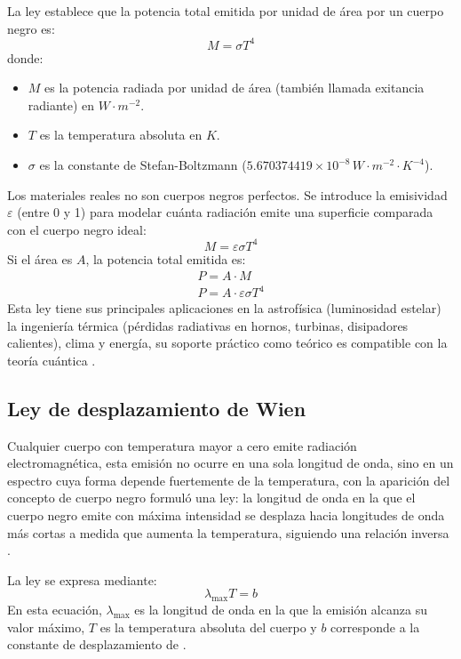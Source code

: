 \documentclass[11pt,a4paper,spanish]{book}
\begin{document}
La ley establece que la potencia total emitida por unidad de
área por un cuerpo negro es:
\begin{equation}
  M = \sigma T^4
\end{equation}
donde:
\begin{itemize}[nosep]
  \item $M$ es la potencia radiada por unidad de área (también llamada
    exitancia radiante) en $W\cdot m^{-2}$.
  \item $T$ es la temperatura absoluta en $K$.
  \item $\sigma$ es la constante de Stefan-Boltzmann ($5.670374419
    \times 10^{-8} \, W\cdot m^{-2}\cdot K^{-4}$).
\end{itemize}
Los materiales reales no son cuerpos negros perfectos. Se introduce
la emisividad \(\varepsilon \) (entre 0 y 1)
para modelar cuánta radiación emite una superficie comparada con el
cuerpo negro ideal:
\begin{equation}
  M = \varepsilon \sigma T^4
\end{equation}
Si el área es \(A\), la potencia total emitida es:
\begin{equation}
  \begin{aligned}
    P = A \cdot M \\
    P = A \cdot \varepsilon \sigma T^4
  \end{aligned}
\end{equation}
Esta ley tiene sus principales aplicaciones en la astrofísica
(luminosidad estelar) la ingeniería térmica (pérdidas radiativas
en hornos, turbinas, disipadores calientes), clima y energía, su
soporte práctico como teórico es compatible con la teoría
cuántica \citep{planck1900}.
\subsection{Ley de desplazamiento de Wien}
Cualquier cuerpo con temperatura mayor a cero emite radiación
electromagnética, esta emisión no ocurre en una sola longitud de onda,
sino en un espectro cuya forma depende fuertemente de la temperatura,
con la aparición del concepto
de cuerpo negro \cite{wien1893} formuló una ley: la longitud de onda
en la que el
cuerpo negro emite con máxima intensidad se desplaza hacia longitudes
de onda más
cortas a medida que aumenta la temperatura, siguiendo una relación
inversa \cite{wien1893}.

La ley se expresa mediante:
\begin{equation}
  \lambda_{\text{max}} T = b
\end{equation}
En esta ecuación, \(\lambda_{\text{max}}\) es la longitud de onda en la que la
emisión alcanza su valor máximo, \(T\) es la temperatura absoluta del
cuerpo y \(b\)
corresponde a la constante de desplazamiento de \cite{wien1893}.
\end{document}
